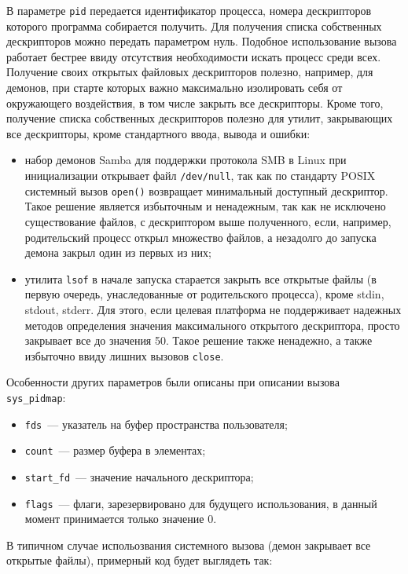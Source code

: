 В параметре \texttt{pid} передается идентификатор процесса, номера дескрипторов
которого программа собирается получить. Для получения списка собственных
дескрипторов можно передать параметром нуль. Подобное использование вызова
работает бестрее ввиду отсутствия необходимости искать процесс среди всех.
Получение своих открытых файловых дескрипторов полезно, например, для демонов,
при старте которых важно максимально изолировать себя от окружающего
воздействия, в том числе закрыть все дескрипторы. Кроме того, получение списка
собственных дескрипторов полезно для утилит, закрывающих все дескрипторы, кроме
стандартного ввода, вывода и ошибки:
\begin{itemize}
\item набор демонов Samba для поддержки протокола SMB в Linux при инициализации
  открывает файл \texttt{/dev/null}, так как по стандарту POSIX системный вызов
  \texttt{open()} возвращает минимальный доступный дескриптор. Такое решение
  является избыточным и ненадежным, так как не исключено существование файлов, с
  дескриптором выше полученного, если, например, родительский процесс открыл
  множество файлов, а незадолго до запуска демона закрыл один из первых из них;
\item утилита \texttt{lsof} в начале запуска старается закрыть все открытые
  файлы (в первую очередь, унаследованные от родительского процесса), кроме
  stdin, stdout, stderr. Для этого, если целевая платформа не поддерживает
  надежных методов определения значения максимального открытого дескриптора,
  просто закрывает все до значения 50. Такое решение также ненадежно, а также
  избыточно ввиду лишних вызовов \texttt{close}.
\end{itemize}

Особенности других параметров были описаны при описании вызова
\texttt{sys\_pidmap}:
\begin{itemize}
\item \texttt{fds}~--- указатель на буфер пространства пользователя;
\item \texttt{count}~--- размер буфера в элементах;
\item \texttt{start\_fd}~--- значение начального дескриптора;
\item \texttt{flags}~--- флаги, зарезервировано для будущего использования,
  в данный момент принимается только значение 0.
\end{itemize}

В типичном случае испольозвания системного вызова (демон закрывает все открытые
файлы), примерный код будет выглядеть так:

